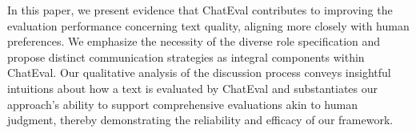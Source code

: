 In this paper, we present evidence that ChatEval contributes to improving the evaluation performance concerning text quality, aligning more closely with human preferences. We emphasize the necessity of the diverse role specification and propose distinct communication strategies as integral components within ChatEval. Our qualitative analysis of the discussion process conveys insightful intuitions about how a text is evaluated by ChatEval and substantiates our approach's ability to support comprehensive evaluations akin to human judgment, thereby demonstrating the reliability and efficacy of our framework.